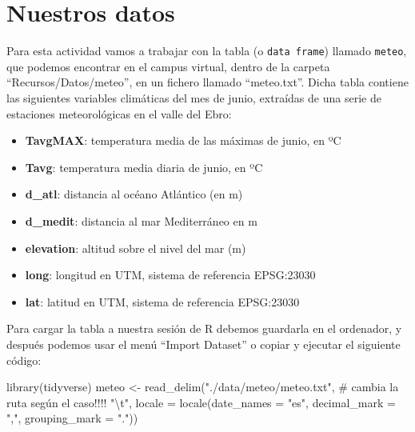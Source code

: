 \documentclass[
  letterpaper,
  DIV=11,
  numbers=noendperiod]{scrreprt}
\newenvironment{Shaded}{\begin{snugshade}}{\end{snugshade}}
\newcommand{\AttributeTok}[1]{\textcolor[rgb]{0.40,0.45,0.13}{#1}}
\newcommand{\CommentTok}[1]{\textcolor[rgb]{0.37,0.37,0.37}{#1}}
\newcommand{\FunctionTok}[1]{\textcolor[rgb]{0.28,0.35,0.67}{#1}}
\newcommand{\NormalTok}[1]{\textcolor[rgb]{0.00,0.23,0.31}{#1}}
\newcommand{\OtherTok}[1]{\textcolor[rgb]{0.00,0.23,0.31}{#1}}
\newcommand{\SpecialCharTok}[1]{\textcolor[rgb]{0.37,0.37,0.37}{#1}}
\newcommand{\StringTok}[1]{\textcolor[rgb]{0.13,0.47,0.30}{#1}}
\begin{document}
\hypertarget{nuestros-datos}{%
\section{Nuestros datos}\label{nuestros-datos}}

Para esta actividad vamos a trabajar con la tabla (o
\texttt{data\ frame}) llamado \texttt{meteo}, que podemos encontrar en
el campus virtual, dentro de la carpeta ``Recursos/Datos/meteo'', en un
fichero llamado ``meteo.txt''. Dicha tabla contiene las siguientes
variables climáticas del mes de junio, extraídas de una serie de
estaciones meteorológicas en el valle del Ebro:

\begin{itemize}
\item
  \textbf{TavgMAX}: temperatura media de las máximas de junio, en ºC
\item
  \textbf{Tavg}: temperatura media diaria de junio, en ºC
\item
  \textbf{d\_atl}: distancia al océano Atlántico (en m)
\item
  \textbf{d\_medit}: distancia al mar Mediterráneo en m
\item
  \textbf{elevation}: altitud sobre el nivel del mar (m)
\item
  \textbf{long}: longitud en UTM, sistema de referencia EPSG:23030
\item
  \textbf{lat}: latitud en UTM, sistema de referencia EPSG:23030
\end{itemize}

Para cargar la tabla a nuestra sesión de R debemos guardarla en el
ordenador, y después podemos usar el menú ``Import Dataset'' o copiar y
ejecutar el siguiente código:

\begin{Shaded}
\begin{Highlighting}[]
\FunctionTok{library}\NormalTok{(tidyverse)}
\NormalTok{meteo }\OtherTok{\textless{}{-}} \FunctionTok{read\_delim}\NormalTok{(}\StringTok{"./data/meteo/meteo.txt"}\NormalTok{,  }\CommentTok{\# cambia la ruta según el caso!!!!}
                     \StringTok{"}\SpecialCharTok{\textbackslash{}t}\StringTok{"}\NormalTok{, }\AttributeTok{locale =} \FunctionTok{locale}\NormalTok{(}\AttributeTok{date\_names =} \StringTok{"es"}\NormalTok{, }
                                           \AttributeTok{decimal\_mark =} \StringTok{","}\NormalTok{, }
                                           \AttributeTok{grouping\_mark =} \StringTok{"."}\NormalTok{))}
\end{Highlighting}
\end{Shaded}
\end{document}
